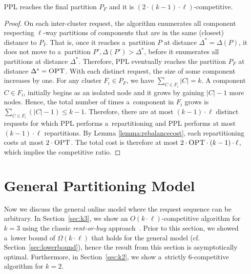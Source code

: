 \documentclass[a4paper,anonymous,USenglish]{lipics-v2019}
\newcommand{\OPT}{\textsc{OPT}\xspace}
\newcommand{\PPL}{\textsc{PPL}\xspace}
\newcommand{\OBRP}{BRP\xspace}
\begin{document}
\begin{theorem}	\label{thm:upperbound}
	\PPL reaches the final partition $P_F$
	 and it is $(2\cdot (k-1)\cdot\ell)$-competitive.
\end{theorem}
\begin{proof}
	On each inter-cluster request,
	the algorithm enumerates all component respecting $\ell$-way partitions of components
	that are in the same (closest) distance to $P_I$.
	That is, 
	once it reaches a~partition $P$ at distance $\Delta^* = \Delta(P)$,
	it does not move to a~partition
	$P', \Delta(P') > \Delta^*$,
	before it enumerates all partitions at distance $\Delta^*$.
	Therefore,
	\PPL eventually reaches  the partition $P_F$ at distance $\Delta^*=\OPT$.
	With each distinct request, 
	the size of some component increases by one.
	For any cluster $F_i \in P_F$,
	we have $\sum_{C \in F_i} |C| = k$.
	A component $C \in F_i$,
	 initially begins as an isolated node and it grows by gaining $|C|-1$ more nodes.
	Hence, the total number of times a~component in $F_i$ grows is 
	$\sum_{C \in F_i} (|C|-1) \leq k-1$.
	Therefore, there are at most  $(k-1)\cdot\ell $ distinct requests
	for which \PPL performs a~repartitioning and
	 \PPL performs at most $(k-1)\cdot\ell $ repartitions.
	By Lemma \ref{lemma:rebalancecost},
	each repartitioning costs at most $2\cdot\OPT$.
	The total cost is therefore at most $2\cdot\OPT\cdot (k-1) \cdot\ell$, which implies the competitive ratio.
\end{proof}


\section{General Partitioning Model}
\label{sec:part}

Now  we discuss the general online
model where the request sequence
can be arbitrary.
In Section~\ref{sec:k3}, we show an $O(k \cdot \ell)$-competitive algorithm for $k=3$ using the classic \emph{rent-or-buy} approach~\cite{karlin-ski-rental}.
Prior to this section, we showed a~lower bound of $\Omega(k \cdot \ell)$  that holds for the general model (cf. Section~\ref{sec:lowerbound}), hence the result from this section is asymptotically optimal.
Furthermore, in Section~\ref{sec:k2}, we show a~strictly $6$-competitive algorithm for $k=2$.
\end{document}
